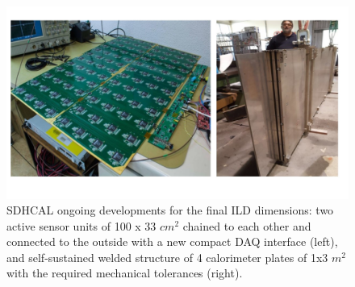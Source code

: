\begin{figure}[t!]
\centering
\includegraphics[width=1.0\hsize]{Detector/fig/SDHCAL_dev.jpg}
\caption{SDHCAL ongoing developments for the final ILD dimensions: two active sensor units of 100 x 33 $cm^2$ chained to each other and connected to the outside with a new compact DAQ interface (left), and self-sustained welded structure of 4 calorimeter plates of 1x3 $m^2$   with the required mechanical tolerances (right).}
\label{fig:det:SDHCAL_dev}
\end{figure}
